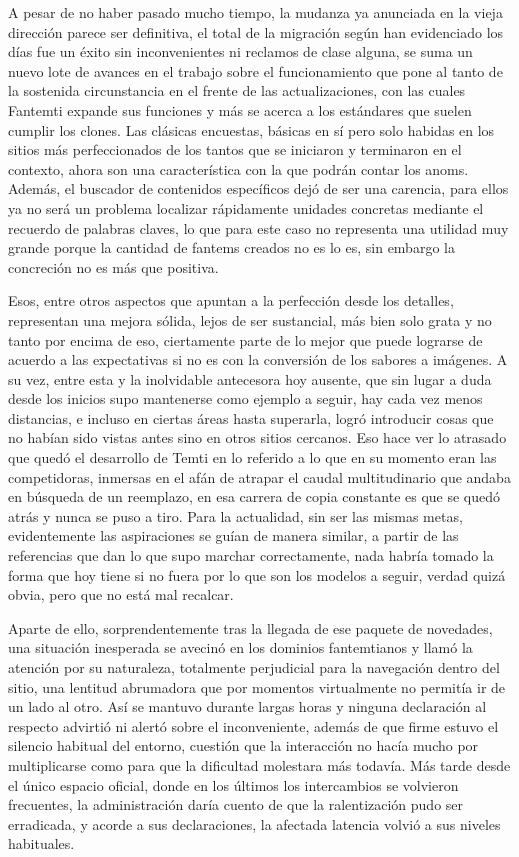 \documentclass[
]{book}
\begin{document}
A pesar de no haber pasado mucho tiempo, la mudanza ya anunciada en la vieja dirección parece ser definitiva, el total de la migración según han evidenciado los días fue un éxito sin inconvenientes ni reclamos de clase alguna, se suma un nuevo lote de avances en el trabajo sobre el funcionamiento que pone al tanto de la sostenida circunstancia en el frente de las actualizaciones, con las cuales Fantemti expande sus funciones y más se acerca a los estándares que suelen cumplir los clones. Las clásicas encuestas, básicas en sí pero solo habidas en los sitios más perfeccionados de los tantos que se iniciaron y terminaron en el contexto, ahora son una característica con la que podrán contar los anoms. Además, el buscador de contenidos específicos dejó de ser una carencia, para ellos ya no será un problema localizar rápidamente unidades concretas mediante el recuerdo de palabras claves, lo que para este caso no representa una utilidad muy grande porque la cantidad de fantems creados no es lo es, sin embargo la concreción no es más que positiva.

Esos, entre otros aspectos que apuntan a la perfección desde los detalles, representan una mejora sólida, lejos de ser sustancial, más bien solo grata y no tanto por encima de eso, ciertamente parte de lo mejor que puede lograrse de acuerdo a las expectativas si no es con la conversión de los sabores a imágenes. A su vez, entre esta y la inolvidable antecesora hoy ausente, que sin lugar a duda desde los inicios supo mantenerse como ejemplo a seguir, hay cada vez menos distancias, e incluso en ciertas áreas hasta superarla, logró introducir cosas que no habían sido vistas antes sino en otros sitios cercanos. Eso hace ver lo atrasado que quedó el desarrollo de Temti en lo referido a lo que en su momento eran las competidoras, inmersas en el afán de atrapar el caudal multitudinario que andaba en búsqueda de un reemplazo, en esa carrera de copia constante es que se quedó atrás y nunca se puso a tiro. Para la actualidad, sin ser las mismas metas, evidentemente las aspiraciones se guían de manera similar, a partir de las referencias que dan lo que supo marchar correctamente, nada habría tomado la forma que hoy tiene si no fuera por lo que son los modelos a seguir, verdad quizá obvia, pero que no está mal recalcar.

Aparte de ello, sorprendentemente tras la llegada de ese paquete de novedades, una situación inesperada se avecinó en los dominios fantemtianos y llamó la atención por su naturaleza, totalmente perjudicial para la navegación dentro del sitio, una lentitud abrumadora que por momentos virtualmente no permitía ir de un lado al otro. Así se mantuvo durante largas horas y ninguna declaración al respecto advirtió ni alertó sobre el inconveniente, además de que firme estuvo el silencio habitual del entorno, cuestión que la interacción no hacía mucho por multiplicarse como para que la dificultad molestara más todavía. Más tarde desde el único espacio oficial, donde en los últimos los intercambios se volvieron frecuentes, la administración daría cuento de que la ralentización pudo ser erradicada, y acorde a sus declaraciones, la afectada latencia volvió a sus niveles habituales.
\end{document}
